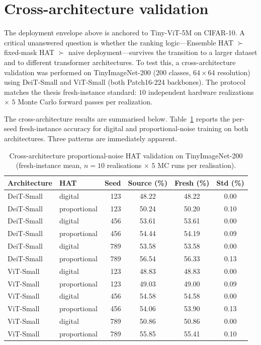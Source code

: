 \section{Cross-architecture validation}
\label{sec:cross-architecture-validation}

The deployment envelope above is anchored to Tiny-ViT-5M on CIFAR-10.  A critical unanswered question is whether the ranking logic---Ensemble HAT $\succ$ fixed-mask HAT $\succ$ naive deployment---survives the transition to a larger dataset and to different transformer architectures.  To test this, a cross-architecture validation was performed on TinyImageNet-200 ($200$ classes, $64\times64$ resolution) using DeiT-Small and ViT-Small (both Patch16-224 backbones).  The protocol matches the thesis fresh-instance standard: $10$ independent hardware realizations $\times$ $5$ Monte Carlo forward passes per realization.

The cross-architecture results are summarised below.  Table~\ref{tab:cross-arch-proportional} reports the per-seed fresh-instance accuracy for digital and proportional-noise training on both architectures.  Three patterns are immediately apparent.

\begin{table}[t]
\centering
\caption{Cross-architecture proportional-noise HAT validation on TinyImageNet-200 (fresh-instance mean, $n=10$ realisations $\times$ $5$ MC runs per realisation).}
\label{tab:cross-arch-proportional}
\small
\begin{tabular}{@{}llrccc@{}}
\toprule
\textbf{Architecture} & \textbf{HAT} & \textbf{Seed} & \textbf{Source (\%)} & \textbf{Fresh (\%)} & \textbf{Std (\%)} \\
\midrule
DeiT-Small & digital & 123 & 48.22 & 48.22 & 0.00 \\
DeiT-Small & proportional & 123 & 50.24 & 50.20 & 0.10 \\
DeiT-Small & digital & 456 & 53.61 & 53.61 & 0.00 \\
DeiT-Small & proportional & 456 & 54.44 & 54.19 & 0.09 \\
DeiT-Small & digital & 789 & 53.58 & 53.58 & 0.00 \\
DeiT-Small & proportional & 789 & 56.54 & 56.33 & 0.13 \\
\midrule
ViT-Small & digital & 123 & 48.83 & 48.83 & 0.00 \\
ViT-Small & proportional & 123 & 49.03 & 49.00 & 0.09 \\
ViT-Small & digital & 456 & 54.58 & 54.58 & 0.00 \\
ViT-Small & proportional & 456 & 54.06 & 53.90 & 0.13 \\
ViT-Small & digital & 789 & 50.86 & 50.86 & 0.00 \\
ViT-Small & proportional & 789 & 55.85 & 55.41 & 0.10 \\
\bottomrule
\end{tabular}
\end{table}

